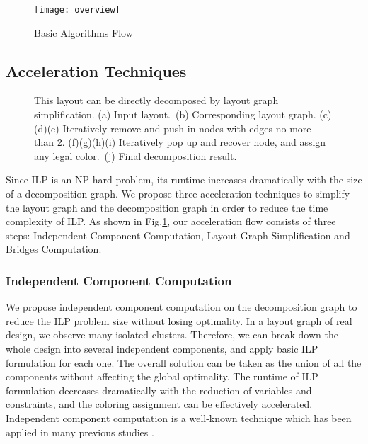 \documentclass[10pt,conference]{IEEEtran}
\begin{document}
\begin{figure}[tb]
	\centering
	\texttt{[image: overview]}
	\caption{Basic Algorithms Flow}
	\label{fig:overview}
\end{figure}

\subsection{Acceleration Techniques}

\begin{figure*}[t]
	\centering
	\hspace{.1em}
	\caption{This layout can be directly decomposed by layout graph simplification.
	(a) Input layout.~(b) Corresponding layout graph.
	(c)(d)(e) Iteratively remove and push in nodes with edges no more than 2.
	(f)(g)(h)(i) Iteratively pop up and recover node, and assign any legal color.~(j) Final decomposition result.
}
	\label{fig:Simplify}
\end{figure*}

Since ILP is an NP-hard problem, its runtime increases dramatically with the size of a decomposition graph.
We propose three acceleration techniques to simplify the layout graph and the decomposition graph in order to reduce the time complexity of ILP.
As shown in Fig.\ref{fig:overview}, our acceleration flow consists of three steps: Independent Component Computation, Layout Graph Simplification and Bridges Computation.

\subsubsection{Independent Component Computation}

We propose independent component computation on the decomposition graph to reduce the ILP problem size without losing optimality.
In a layout graph of real design, we observe many isolated clusters.
Therefore, we can break down the whole design into several independent components, and apply basic ILP formulation for each one.
The overall solution can be taken as the union of all the components without affecting the global optimality.
The runtime of ILP formulation decreases dramatically with the reduction of variables and constraints, and the coloring assignment can be effectively accelerated.
Independent component computation is a well-known technique which has been applied in many previous studies \cite{DPL_ICCAD08_Kahng}\cite{DPL_ISPD09_Yuan}\cite{DPL_ASPDAC2010_Yang}\cite{DPL_ICCAD2010_Yuan}.
\end{document}
